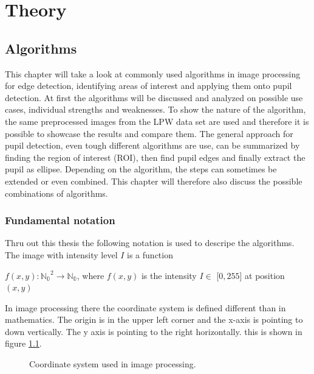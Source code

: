 \chapter{Theory}
\section{Algorithms}
This chapter will take a look at commonly used algorithms in image processing for edge detection, identifying areas of interest and applying them onto pupil detection. At first the algorithms will be discussed and analyzed on possible use cases, individual strengths and weaknesses. To show the nature of the algorithm, the same preprocessed images from the LPW data set are used and therefore it is possible to showcase the results and compare them. The general approach for pupil detection, even tough different algorithms are use, can be summarized by finding the region of interest (ROI), then find pupil edges and finally extract the pupil as ellipse. Depending on the algorithm, the steps can sometimes be extended or even combined. This chapter will therefore also discuss the possible combinations of algorithms. 

\subsection{Fundamental notation}\label{subsec:funda}
Thru out this thesis the following notation is used to descripe the algorithms.
The image with intensity level $I$ is a function 

$f(x,y): \mathbb{\mathbb{N_0} }^2 \rightarrow \mathbb{\mathbb{N_0}}$, where $f(x,y)$ is the intensity $I \in $ [$0,255$] at position $(x,y)$

In image processing there the coordinate system is defined different than in mathematics. The origin is in the upper left corner and the x-axis is pointing to down vertically. The y axis is pointing to the right horizontally. this is shown in figure \ref{fig:coordsystem}.

\begin{figure}[h]
    \centering


    \caption{Coordinate system used in image processing.}
    \label{fig:coordsystem}
\end{figure}

